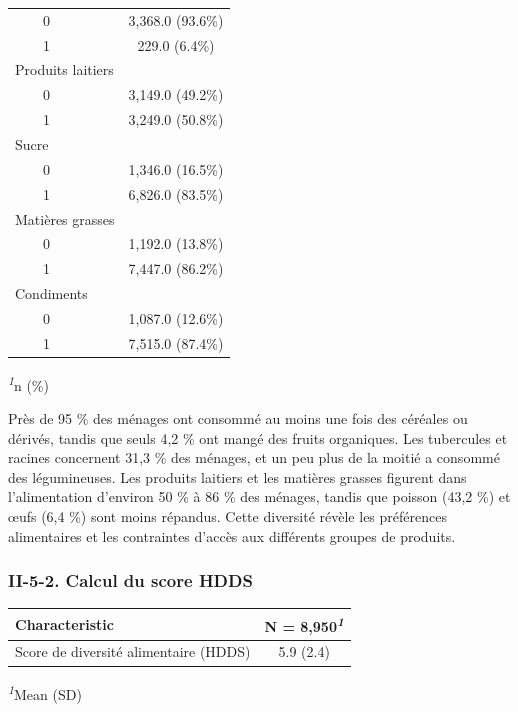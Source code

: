 \documentclass[
]{article}
\begin{document}
\begin{table}[!t]
\begin{tabular*}{\linewidth}{@{\extracolsep{\fill}}lc}
    0 & 3,368.0 (93.6\%) \\ 
    1 & 229.0 (6.4\%) \\ 
Produits laitiers &  \\ 
    0 & 3,149.0 (49.2\%) \\ 
    1 & 3,249.0 (50.8\%) \\ 
Sucre &  \\ 
    0 & 1,346.0 (16.5\%) \\ 
    1 & 6,826.0 (83.5\%) \\ 
Matières grasses &  \\ 
    0 & 1,192.0 (13.8\%) \\ 
    1 & 7,447.0 (86.2\%) \\ 
Condiments &  \\ 
    0 & 1,087.0 (12.6\%) \\ 
    1 & 7,515.0 (87.4\%) \\ 
\bottomrule
\end{tabular*}
\begin{minipage}{\linewidth}
\textsuperscript{\textit{1}}n (\%)\\
\end{minipage}
\end{table}

Près de 95 \% des ménages ont consommé au moins une fois des céréales ou
dérivés, tandis que seuls 4,2 \% ont mangé des fruits organiques. Les
tubercules et racines concernent 31,3 \% des ménages, et un peu plus de
la moitié a consommé des légumineuses. Les produits laitiers et les
matières grasses figurent dans l'alimentation d'environ 50 \% à 86 \%
des ménages, tandis que poisson (43,2 \%) et œufs (6,4 \%) sont moins
répandus. Cette diversité révèle les préférences alimentaires et les
contraintes d'accès aux différents groupes de produits.

\hypertarget{ii-5-2.-calcul-du-score-hdds}{%
\subsubsection{II-5-2. Calcul du score
HDDS}\label{ii-5-2.-calcul-du-score-hdds}}

\begin{table}[!t]
\fontsize{9.8pt}{11.7pt}\selectfont
\begin{tabular*}{\linewidth}{@{\extracolsep{\fill}}lc}
\toprule
\textbf{Characteristic} & \textbf{N = 8,950}\textsuperscript{\textit{1}} \\ 
\midrule\addlinespace[2.5pt]
Score de diversité alimentaire (HDDS) & 5.9 (2.4) \\ 
\bottomrule
\end{tabular*}
\begin{minipage}{\linewidth}
\textsuperscript{\textit{1}}Mean (SD)\\
\end{minipage}
\end{table}
\end{document}
